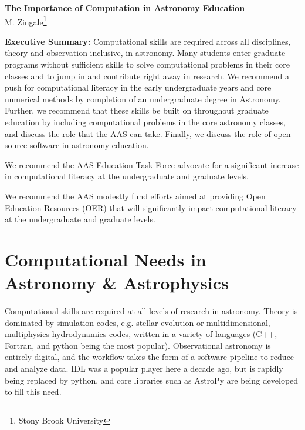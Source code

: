 \documentclass[11pt]{article}
\begin{document}
\thispagestyle{plain}

\begin{center}
{\Large \sffamily \bfseries The Importance of Computation in Astronomy Education} \\
{M. Zingale\footnote{Stony Brook University}}
\end{center}

\begin{tcolorbox}
{\sffamily \bfseries Executive Summary:} Computational skills are required
across all disciplines, theory and observation inclusive, in astronomy.
Many students enter graduate programs without sufficient skills
to solve computational problems in their core classes and to jump in and
contribute right away in research.  We recommend a push for computational
literacy in the early undergraduate years and core numerical methods by
completion of an undergraduate degree in Astronomy.  Further, we recommend
that these skills be built on throughout graduate education by including
computational problems in the core astronomy classes, and discuss
the role that the AAS can take.  Finally, we discuss
the role of open source software in astronomy education.

\vspace {0.1in} We recommend the AAS Education Task Force advocate for
a significant increase in computational literacy at the undergraduate
and graduate levels.

\vspace {0.1in} We recommend the AAS modestly fund efforts aimed at
providing Open Education Resources (OER) that will significantly
impact computational literacy at the undergraduate and graduate
levels.


\end{tcolorbox}

\section{Computational Needs in Astronomy \& Astrophysics}

Computational skills are required at all levels of research in
astronomy.  Theory is dominated by simulation codes, e.g. stellar
evolution or multidimensional, multiphysics hydrodynamics codes,
written in a variety of languages (C++, Fortran, and python being the
most popular).  Observational astronomy is entirely digital, and the
workflow takes the form of a software pipeline to reduce and analyze
data.  IDL was a popular player here a decade ago, but is rapidly
being replaced by python, and core libraries such as AstroPy are being
developed to fill this need.
\end{document}
